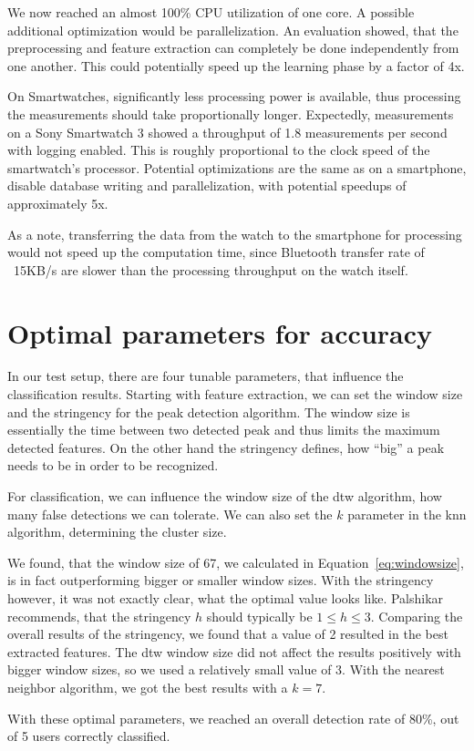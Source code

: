 We now reached an almost 100\% CPU utilization of one core. A possible additional optimization would be parallelization. An evaluation showed, that the preprocessing and feature extraction can completely be done independently from one another. This could potentially speed up the learning phase by a factor of 4x.

On Smartwatches, significantly less processing power is available, thus processing the measurements should take proportionally longer. Expectedly, measurements on a Sony Smartwatch 3 showed a throughput of 1.8 measurements per second with logging enabled. This is roughly proportional to the clock speed of the smartwatch's processor. Potential optimizations are the same as on a smartphone, \ie disable database writing and parallelization, with potential speedups of approximately 5x. 

As a note, transferring the data from the watch to the smartphone for processing would not speed up the computation time, since Bluetooth transfer rate of ~15KB/s are slower than the processing throughput on the watch itself.

\section{Optimal parameters for accuracy}
In our test setup, there are four tunable parameters, that influence the classification results. Starting with feature extraction, we can set the window size and the stringency for the peak detection algorithm. The window size is essentially the time between two detected peak and thus limits the maximum detected features. On the other hand the stringency defines, how ``big'' a peak needs to be in order to be recognized.

For classification, we can influence the window size of the \gls{dtw} algorithm, \ie how many false detections we can tolerate. We can also set the $k$ parameter in the \gls{knn} algorithm, determining the cluster size.

We found, that the window size of 67, we calculated in Equation~\ref{eq:windowsize}, is in fact outperforming bigger or smaller window sizes. With the stringency however, it was not exactly clear, what the optimal value looks like. Palshikar\cite{palshikar2009simple} recommends, that the stringency $h$ should typically be $1 \leq h \leq 3$. Comparing the overall results of the stringency, we found that a value of 2 resulted in the best extracted features. The \gls{dtw} window size did not affect the results positively with bigger window sizes, so we used a relatively small value of 3. With the nearest neighbor algorithm, we got the best results with a $k = 7$.

With these optimal parameters, we reached an overall detection rate of 80\%,  out of 5 users correctly classified.